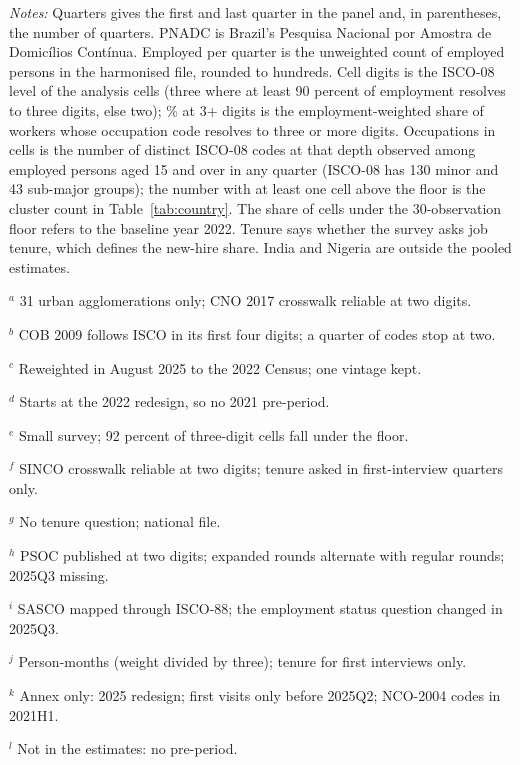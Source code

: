 \begin{table}[htbp]
\begin{threeparttable}
\begin{tablenotes}[flushleft]
\item \textit{Notes:} Quarters gives the first and last quarter in the panel and, in parentheses, the number of quarters. PNADC is Brazil's Pesquisa Nacional por Amostra de Domic\'ilios Cont\'inua. Employed per quarter is the unweighted count of employed persons in the harmonised file, rounded to hundreds. Cell digits is the ISCO-08 level of the analysis cells (three where at least 90 percent of employment resolves to three digits, else two); \% at 3+ digits is the employment-weighted share of workers whose occupation code resolves to three or more digits. Occupations in cells is the number of distinct ISCO-08 codes at that depth observed among employed persons aged 15 and over in any quarter (ISCO-08 has 130 minor and 43 sub-major groups); the number with at least one cell above the floor is the cluster count in Table~\ref{tab:country}. The share of cells under the 30-observation floor refers to the baseline year 2022. Tenure says whether the survey asks job tenure, which defines the new-hire share. India and Nigeria are outside the pooled estimates.
\item $^{a}$ 31 urban agglomerations only; CNO 2017 crosswalk reliable at two digits.
\item $^{b}$ COB 2009 follows ISCO in its first four digits; a quarter of codes stop at two.
\item $^{c}$ Reweighted in August 2025 to the 2022 Census; one vintage kept.
\item $^{d}$ Starts at the 2022 redesign, so no 2021 pre-period.
\item $^{e}$ Small survey; 92 percent of three-digit cells fall under the floor.
\item $^{f}$ SINCO crosswalk reliable at two digits; tenure asked in first-interview quarters only.
\item $^{g}$ No tenure question; national file.
\item $^{h}$ PSOC published at two digits; expanded rounds alternate with regular rounds; 2025Q3 missing.
\item $^{i}$ SASCO mapped through ISCO-88; the employment status question changed in 2025Q3.
\item $^{j}$ Person-months (weight divided by three); tenure for first interviews only.
\item $^{k}$ Annex only: 2025 redesign; first visits only before 2025Q2; NCO-2004 codes in 2021H1.
\item $^{l}$ Not in the estimates: no pre-period.
\end{tablenotes}
\end{threeparttable}
\end{table}
